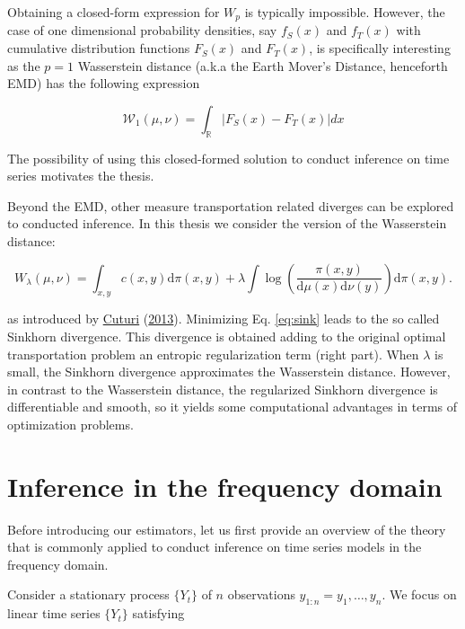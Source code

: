 \documentclass[
  11pt,
]{article}
\begin{document}
Obtaining a closed-form expression for \(W_{p}\) is typically
impossible. However, the case of one dimensional probability densities,
say \(f_{S}(x)\) and \(f_{T}(x)\) with cumulative distribution functions
\(F_{S}(x)\) and \(F_{T}(x)\), is specifically interesting as the
\(p = 1\) Wasserstein distance (a.k.a the Earth Mover's Distance,
henceforth EMD) has the following expression

\begin{equation}
\mathcal{W}_{1}(\mu, \nu)=\int_{\mathbb{R}}\left|F_{S}(x)-F_{T}(x)\right| d x
\label{eq:wass_1}
\end{equation}

The possibility of using this closed-formed solution to conduct
inference on time series motivates the thesis.

Beyond the EMD, other measure transportation related diverges can be
explored to conducted inference. In this thesis we consider the version
of the Wasserstein distance:

\begin{equation}
W_{\lambda}(\mu, \nu) =\int_{x, y} c(x, y) \mathrm{d} \pi(x, y)+ \lambda \int \log \left(\frac{\pi(x, y)}{\mathrm{d} \mu(x) \mathrm{d} \nu(y)}\right) \mathrm{d} \pi(x, y). 
\label{eq:sink}
\end{equation}

as introduced by \protect\hyperlink{ref-cuturi2013sinkhorn}{Cuturi}
(\protect\hyperlink{ref-cuturi2013sinkhorn}{2013}). Minimizing Eq.
\ref{eq:sink} leads to the so called Sinkhorn divergence. This
divergence is obtained adding to the original optimal transportation
problem an entropic regularization term (right part). When \(\lambda\)
is small, the Sinkhorn divergence approximates the Wasserstein distance.
However, in contrast to the Wasserstein distance, the regularized
Sinkhorn divergence is differentiable and smooth, so it yields some
computational advantages in terms of optimization problems.

\hypertarget{inference-in-the-frequency-domain}{%
\section{Inference in the frequency
domain}\label{inference-in-the-frequency-domain}}

Before introducing our estimators, let us first provide an overview of
the theory that is commonly applied to conduct inference on time series
models in the frequency domain.

Consider a stationary process \(\{Y_t\}\) of \(n\) observations
\(y_{1:n} = y_1, … ,y_n\). We focus on linear time series \(\{Y_t\}\)
satisfying
\end{document}

